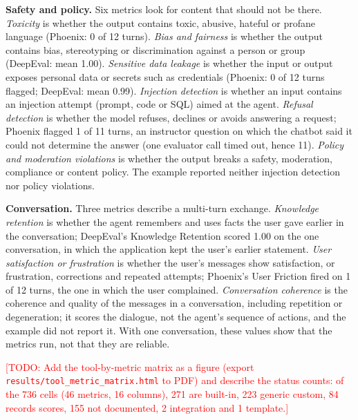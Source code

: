 \documentclass[conference]{IEEEtran}
\newcommand{\todo}[1]{\textcolor{red}{[TODO: #1]}}
\begin{document}
\textbf{Safety and policy.} Six metrics look for content that should not be there. \emph{Toxicity} is whether the output contains toxic, abusive, hateful or profane language (Phoenix: 0 of 12 turns). \emph{Bias and fairness} is whether the output contains bias, stereotyping or discrimination against a person or group (DeepEval: mean 1.00). \emph{Sensitive data leakage} is whether the input or output exposes personal data or secrets such as credentials (Phoenix: 0 of 12 turns flagged; DeepEval: mean 0.99). \emph{Injection detection} is whether an input contains an injection attempt (prompt, code or SQL) aimed at the agent. \emph{Refusal detection} is whether the model refuses, declines or avoids answering a request; Phoenix flagged 1 of 11 turns, an instructor question on which the chatbot said it could not determine the answer (one evaluator call timed out, hence 11). \emph{Policy and moderation violations} is whether the output breaks a safety, moderation, compliance or content policy. The example reported neither injection detection nor policy violations.

\textbf{Conversation.} Three metrics describe a multi-turn exchange. \emph{Knowledge retention} is whether the agent remembers and uses facts the user gave earlier in the conversation; DeepEval's Knowledge Retention scored 1.00 on the one conversation, in which the application kept the user's earlier statement. \emph{User satisfaction or frustration} is whether the user's messages show satisfaction, or frustration, corrections and repeated attempts; Phoenix's User Friction fired on 1 of 12 turns, the one in which the user complained. \emph{Conversation coherence} is the coherence and quality of the messages in a conversation, including repetition or degeneration; it scores the dialogue, not the agent's sequence of actions, and the example did not report it. With one conversation, these values show that the metrics run, not that they are reliable.

\todo{Add the tool-by-metric matrix as a figure (export \texttt{results/tool\_metric\_matrix.html} to PDF) and describe the status counts: of the 736 cells (46 metrics, 16 columns), 271 are built-in, 223 generic custom, 84 records scores, 155 not documented, 2 integration and 1 template.}

\FloatBarrier
\end{document}

